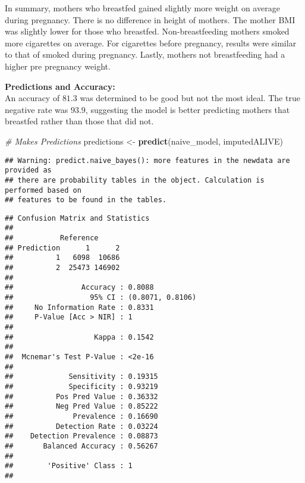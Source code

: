 \documentclass[
]{article}
\newenvironment{Shaded}{\begin{snugshade}}{\end{snugshade}}
\newcommand{\CommentTok}[1]{\textcolor[rgb]{0.56,0.35,0.01}{\textit{#1}}}
\newcommand{\FunctionTok}[1]{\textcolor[rgb]{0.13,0.29,0.53}{\textbf{#1}}}
\newcommand{\NormalTok}[1]{#1}
\newcommand{\OtherTok}[1]{\textcolor[rgb]{0.56,0.35,0.01}{#1}}
\newcommand{\SpecialCharTok}[1]{\textcolor[rgb]{0.81,0.36,0.00}{\textbf{#1}}}
\begin{document}
In summary, mothers who breastfed gained slightly more weight on average
during pregnancy. There is no difference in height of mothers. The
mother BMI was slightly lower for those who breastfed. Non-breastfeeding
mothers smoked more cigarettes on average. For cigarettes before
pregnancy, results were similar to that of smoked during pregnancy.
Lastly, mothers not breastfeeding had a higher pre pregnancy weight.

\textbf{Predictions and Accuracy:}\\
An accuracy of \(81.3%
\) was determined to be good but not the most ideal. The true negative
rate was \(93.9%
\), suggesting the model is better predicting mothers that breastfed
rather than those that did not.

\begin{Shaded}
\begin{Highlighting}[]
\CommentTok{\# Makes Predictions}
\NormalTok{predictions }\OtherTok{\textless{}{-}} \FunctionTok{predict}\NormalTok{(naive\_model, imputedALIVE)}
\end{Highlighting}
\end{Shaded}

\begin{verbatim}
## Warning: predict.naive_bayes(): more features in the newdata are provided as
## there are probability tables in the object. Calculation is performed based on
## features to be found in the tables.
\end{verbatim}

\begin{Shaded}
\end{Shaded}

\begin{verbatim}
## Confusion Matrix and Statistics
## 
##           Reference
## Prediction      1      2
##          1   6098  10686
##          2  25473 146902
##                                           
##                Accuracy : 0.8088          
##                  95% CI : (0.8071, 0.8106)
##     No Information Rate : 0.8331          
##     P-Value [Acc > NIR] : 1               
##                                           
##                   Kappa : 0.1542          
##                                           
##  Mcnemar's Test P-Value : <2e-16          
##                                           
##             Sensitivity : 0.19315         
##             Specificity : 0.93219         
##          Pos Pred Value : 0.36332         
##          Neg Pred Value : 0.85222         
##              Prevalence : 0.16690         
##          Detection Rate : 0.03224         
##    Detection Prevalence : 0.08873         
##       Balanced Accuracy : 0.56267         
##                                           
##        'Positive' Class : 1               
## 
\end{verbatim}
\end{document}
